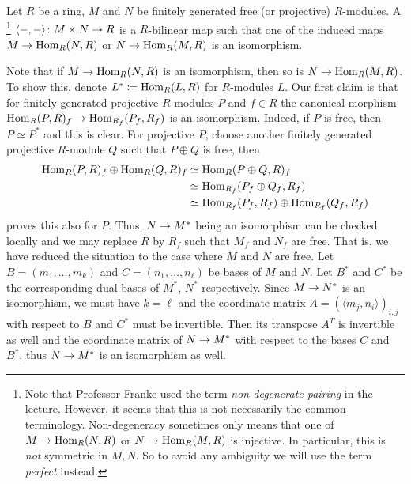 \documentclass[a4paper,parskip=half,numbers=enddot, DIV=12]{scrreprt}
\begin{document}
\begin{defi}
	Let $R$ be a ring, $M$ and $N$ be finitely generated free (or projective) $R$-modules. A \footnote{Note that Professor Franke used the term \emph{non-degenerate pairing} in the lecture. However, it seems that this is not necessarily the common terminology. Non-degeneracy sometimes only means that one of $M\morphism \Hom_R(N,R)$ or $N\morphism\Hom_R(M,R)$ is injective. In particular, this is \emph{not} symmetric in $M,N$. So to avoid any ambiguity we will use the term \emph{perfect} instead.} $\langle -,-\rangle\colon M\times N\morphism R$ is a $R$-bilinear map such that one of the induced maps $M\morphism\Hom_R(N,R)$ or $N\morphism \Hom_R(M,R)$ is an isomorphism.
\end{defi}
\begin{rem*}
	Note that if $M\morphism\Hom_R(N,R)$ is an isomorphism, then so is $N\morphism\Hom_R(M,R)$. To show this, denote $L^*\coloneqq \operatorname{Hom}_R(L,R)$ for $R$-modules $L$. Our first claim is that for finitely generated projective $R$-modules $P$ and $f\in R$ the canonical morphism $\Hom_R(P,R)_f\morphism \Hom_{R_f}(P_f,R_f)$ is an isomorphism. Indeed, if $P$ is free, then $P\simeq P^*$ and this is clear. For projective $P$, choose another finitely generated projective $R$-module $Q$ such that $P\oplus Q$ is free, then
	\begin{align*}
	\operatorname{Hom}_R(P,R)_f\oplus\operatorname{Hom}_R(Q,R)_f&\simeq\operatorname{Hom}_R(P\oplus Q,R)_f\\
	&\simeq\operatorname{Hom}_{R_f}(P_f\oplus Q_f,R_f)\\
	&\simeq \operatorname{Hom}_{R_f}(P_f,R_f)\oplus \operatorname{Hom}_{R_f}(Q_f,R_f)
	\end{align*}
	proves this also for $P$. Thus, $N\morphism M^*$ being an isomorphism can be checked locally and we may replace $R$ by $R_f$ such that $M_f$ and $N_f$ are free. That is, we have reduced the situation to the case where $M$ and $N$ are free. Let $B=(m_1,\ldots,m_k)$ and $C=(n_1,\ldots,n_\ell)$ be bases of $M$ and $N$. Let $B^*$ and $C^*$ be the corresponding dual bases of $M^*$, $N^*$ respectively. Since $M\morphism N^*$ is an isomorphism, we must have $k=\ell$ and the coordinate matrix $A=(\langle m_j,n_i\rangle)_{i,j}$ with respect to $B$ and $C^*$ must be invertible. Then its transpose $A^T$ is invertible as well and the coordinate matrix of $N\morphism M^*$ with respect to the bases $C$ and $B^*$, thus $N\morphism M^*$ is an isomorphism as well.
\end{rem*}
\end{document}
